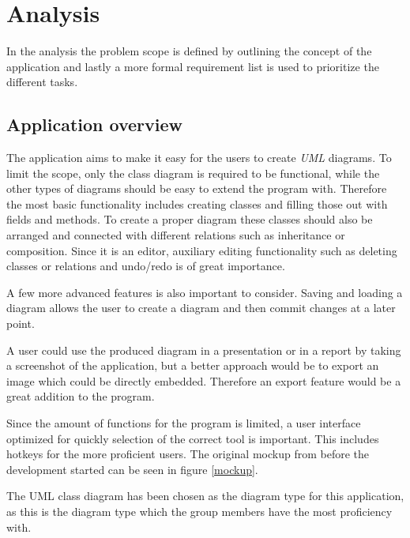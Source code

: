 \section{Analysis}
In the analysis the problem scope is defined by outlining the concept of the
application and lastly a more formal requirement list is used to prioritize the
different tasks.

\subsection{Application overview}
The application aims to make it easy for the users to create \textit{UML}
diagrams. To limit the scope, only the class diagram is required to be
functional, while the other types of diagrams should be easy to extend 
the program with. Therefore the most basic functionality includes creating
classes and filling those out with fields and methods. To create a proper
diagram these classes should also be arranged and connected with different
relations such as inheritance or composition. Since it is an editor, auxiliary
editing functionality such as deleting classes or relations and undo/redo is
of great importance. 

A few more advanced features is also important to consider. Saving and loading a
diagram allows the user to create a diagram and then commit changes at a later
point.

A user could use the produced diagram in a presentation or in a report by
taking a screenshot of the application, but a better approach would be to export
an image which could be directly embedded. Therefore an export feature would be
a great addition to the program. 

Since the amount of functions for the program is limited, a user interface
optimized for quickly selection of the correct tool is important. This
includes hotkeys for the more proficient users. The original mockup from before
the development started can be seen in figure \ref{mockup}.

The UML class diagram has been chosen as the diagram type for this application, 
as this is the diagram type which the group members have the most proficiency with.

